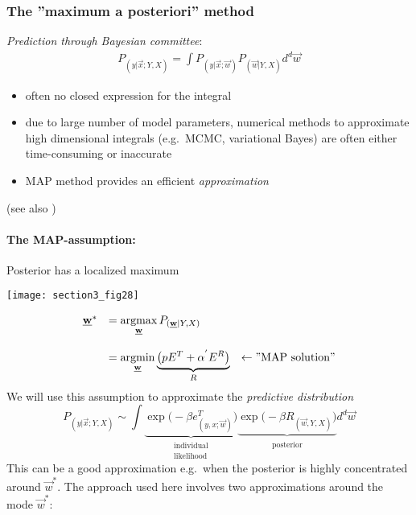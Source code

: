 
\subsubsection{The ''maximum a posteriori'' method}
\emph{Prediction through Bayesian committee}:
\begin{equation}
	\begin{array}{lc}
	P_{(y|\vec{x};Y,X)} = \int P_{(y|\vec{x};\vec{w})}
		P_{(\vec{w}|Y,X)} d^d \vec{w}
	\end{array}
\end{equation}
\begin{itemize}
\item often no closed expression for the integral
\item due to large number of model parameters, numerical methods to
  approximate high dimensional integrals (e.g.\ MCMC, variational
  Bayes) are often either time-consuming or inaccurate
\item MAP method provides an efficient \emph{approximation}
\end{itemize}
(see also \textcite[ch. 5.7]{Bishop2006})

\paragraph{The MAP-assumption:} Posterior has a localized maximum
\begin{center}
\texttt{[image: section3\_fig28]} 
\end{center}
\begin{equation}
	\begin{array}{lll}
	\vec{w}^* 
	& = \argmax\limits_{\vec{w}} P_{(\vec{w}|Y, X)} \\\\
	& = \argmin\limits_{\vec{w}} \underbrace{
		\big(p E^T + \alpha^{'} E^R \big) }_{ R }
		& \leftarrow \text{''MAP solution''}
	\end{array}
\end{equation}
We will use this assumption to approximate the \emph{predictive
  distribution}
\begin{equation}
	P_{(y|\vec{x};Y,X)} \sim \int \underbrace{
		\exp \big( -\beta e_{(y,x;\vec{w})}^T \big) }_{
			\substack{ \text{individual} \\ \text{likelihood} }}
		\underbrace{ \exp \big( -\beta R_{(\vec{w}, Y, X)} \big) }_{
			\substack{ \text{posterior} } }
		d^d \vec{w}
\end{equation}
This can be a good approximation e.g.\ when the posterior is highly
concentrated around $\vec{w}^*$. The approach used here involves two
approximations around the mode $\vec{w}^*$:

